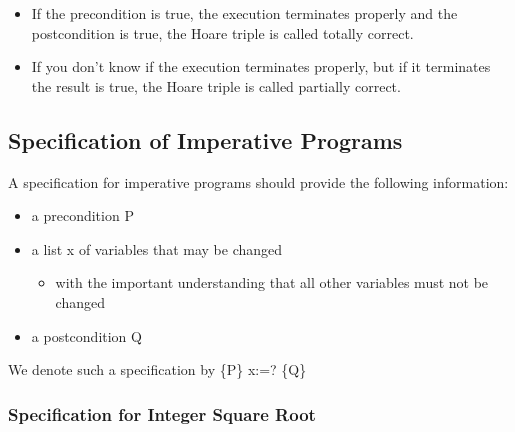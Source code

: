 \begin{itemize}
\tightlist
\item
  If the precondition is true, the execution terminates properly and the
  postcondition is true, the Hoare triple is called totally correct.
\item
  If you don't know if the execution terminates properly, but if it
  terminates the result is true, the Hoare triple is called partially
  correct.
\end{itemize}

\hypertarget{specification-of-imperative-programs}{%
\subsection{Specification of Imperative
Programs}\label{specification-of-imperative-programs}}

A specification for imperative programs should provide the following
information:

\begin{itemize}
\tightlist
\item
  a precondition P
\item
  a list x of variables that may be changed

  \begin{itemize}
  \tightlist
  \item
    with the important understanding that all other variables must not
    be changed
  \end{itemize}
\item
  a postcondition Q
\end{itemize}

We denote such a specification by \{P\} x:=? \{Q\}

\hypertarget{specification-for-integer-square-root}{%
\subsubsection{Specification for Integer Square
Root}\label{specification-for-integer-square-root}}

